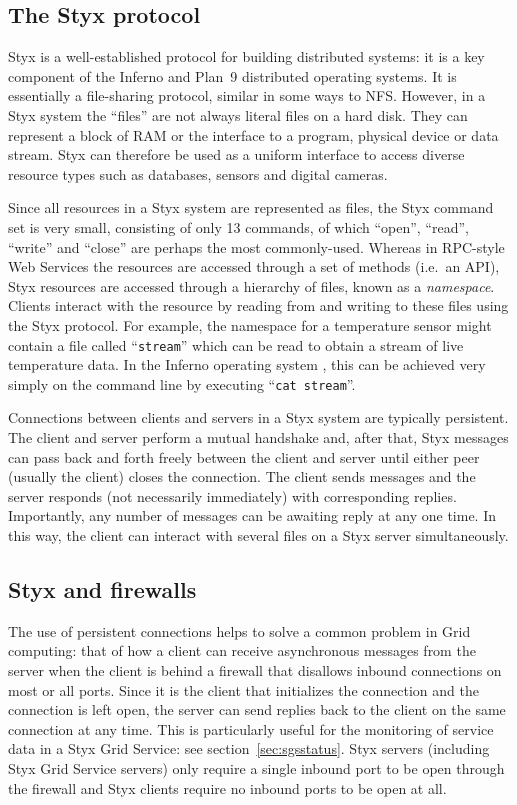 \documentclass[a4paper]{article}
\begin{document}
\begin{multicols}{2}
\section{The Styx protocol}
Styx \cite{Pike:1999} is a well-established protocol for building distributed systems: it is a key component of the Inferno \cite{Inferno} and Plan~9 \cite{Plan9} distributed operating systems.  It is essentially a file-sharing protocol, similar in some ways to NFS.  However, in a Styx system the ``files'' are not always literal files on a hard disk.  They can represent a block of RAM or the interface to a program, physical device or data stream.  Styx can therefore be used as a uniform interface to access diverse resource types such as databases, sensors and digital cameras.

Since all resources in a Styx system are represented as files, the Styx command set is very small, consisting of only 13 commands, of which ``open'', ``read'', ``write'' and ``close'' are perhaps the most commonly-used.  Whereas in RPC-style Web Services the resources are accessed through a set of methods (i.e.\ an API), Styx resources are accessed through a hierarchy of files, known as a \textit{namespace\/}.  Clients interact with the resource by reading from and writing to these files using the Styx protocol.  For example, the namespace for a temperature sensor might contain a file called ``\texttt{stream}'' which can be read to obtain a stream of live temperature data.  In the Inferno operating system \cite{Inferno}, this can be achieved very simply on the command line by executing ``\texttt{cat stream}''.

Connections between clients and servers in a Styx system are typically persistent.  The client and server perform a mutual handshake and, after that, Styx messages can pass back and forth freely between the client and server until either peer (usually the client) closes the connection.  The client sends messages and the server responds (not necessarily immediately) with corresponding replies.  Importantly, any number of messages can be awaiting reply at any one time.  In this way, the client can interact with several files on a Styx server simultaneously.

\subsection{Styx and firewalls}
The use of persistent connections helps to solve a common problem in Grid computing: that of how a client can receive asynchronous messages from the server when the client is behind a firewall that disallows inbound connections on most or all ports.  Since it is the client that initializes the connection and the connection is left open, the server can send replies back to the client on the same connection at any time.  This is particularly useful for the monitoring of service data in a Styx Grid Service: see section~\ref{sec:sgsstatus}.  Styx servers (including Styx Grid Service servers) only require a single inbound port to be open through the firewall and Styx clients require no inbound ports to be open at all.


\end{multicols}
\end{document}
